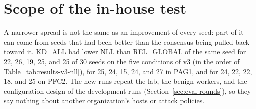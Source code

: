 \section{Scope of the in-house test}
\label{sec:results-scope}

A narrower spread is not the same as an improvement of every seed:
part of it can come from seeds that had been better than the consensus
being pulled back toward it. KD\_ALL had lower NLL than REL\_GLOBAL of
the same seed for 22, 26, 19, 25, and 25 of 30 seeds on the five
conditions of v3 (in the order of Table~\ref{tab:results-v3-nll}), for
25, 24, 15, 24, and 27 in PAG1, and for 24, 22, 22, 18, and 25 on PFC2.
The new runs repeat the lab, the benign workers, and the configuration
design of the development runs (Section~\ref{sec:eval-rounds}), so they
say nothing about another organization's hosts or attack policies.
